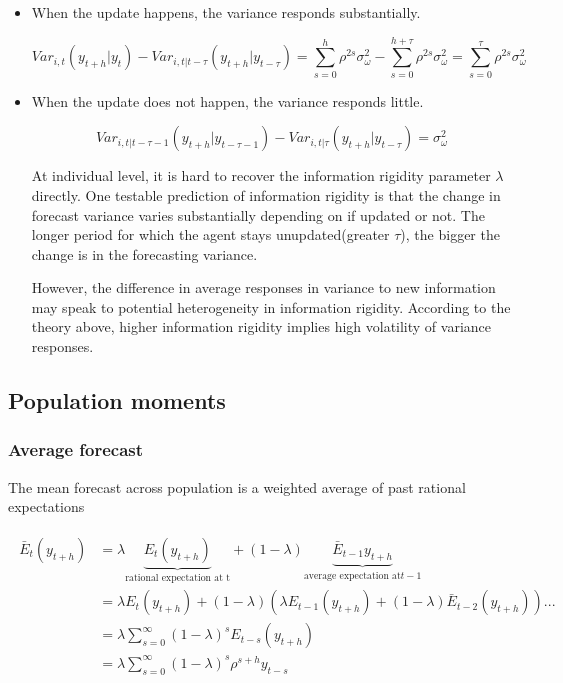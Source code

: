 \documentclass[]{article}
\begin{document}
\begin{itemize}
\item When the update happens, the variance responds substantially.  

$$Var_{i,t}(y_{t+h}|y_t) - Var_{i,t|t-\tau}(y_{t+h}|y_{t-\tau}) = \sum^{h}_{s=0}\rho^{2s} \sigma^2_{\omega} - \sum^{h+\tau}_{s=0}\rho^{2s} \sigma^2_{\omega} = \sum^{\tau}_{s=0} \rho^{2s}\sigma^2_{\omega}$$

\item When the update does not happen, the variance responds little. 

$$Var_{i,t|t-\tau-1}(y_{t+h}|y_{t-\tau-1}) - Var_{i,t|\tau}(y_{t+h}|y_{t-\tau}) = \sigma^2_{\omega}$$

At individual level, it is hard to recover the information rigidity parameter $\lambda$ directly. One testable prediction of information rigidity is that the change in forecast variance varies substantially depending on if updated or not. The longer period for which the agent stays unupdated(greater $\tau$), the bigger the change is in the forecasting variance. 

However, the difference in average responses in variance to new information may speak to potential heterogeneity in information rigidity. According to the theory above, higher information rigidity implies high volatility of variance responses.  
\end{itemize}

\subsection{Population moments} 
	
\subsubsection{Average forecast} 

The mean forecast across population is a weighted average of past rational expectations 

\begin{eqnarray}
\begin{aligned}
\bar E_t(y_{t+h}) & = \lambda \underbrace{E_t(y_{t+h})}_{\textrm{rational expectation at t}} + (1-\lambda) \underbrace{\bar E_{t-1}{y_{t+h}}}_{\textrm{average expectation at} t-1} \\
& = \lambda E_t(y_{t+h}) + (1-\lambda) (\lambda E_{t-1}(y_{t+h})+ (1-\lambda) \bar E_{t-2}(y_{t+h}))... \\
& = \lambda \sum^{\infty}_{s=0} (1-\lambda)^s E_{t-s}(y_{t+h}) \\
& = \lambda \sum^{\infty}_{s=0} (1-\lambda)^s \rho^{s+h}y_{t-s}
\end{aligned}
\end{eqnarray}
\end{document}
